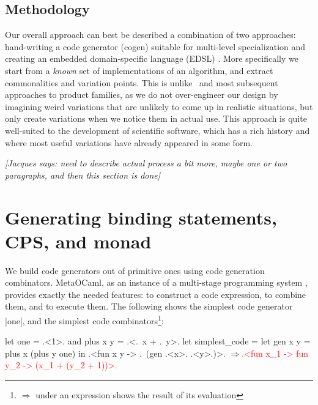 \documentclass[draft]{elsart}
\newcommand{\evalresult}[1]{\ensuremath{\Longrightarrow}\textcolor{red}{#1}}
\newcommand{\jacques}[1]{{\it [Jacques says: #1]}}
\begin{document}
\subsection{Methodology}

Our overall approach can best be described a combination 
of two approaches: hand-writing a code generator (cogen) suitable
for multi-level specialization \cite{Gluck95,GluckJ97} and creating
an embedded domain-specific language (EDSL) \cite{edsl,WhenHowDSL}.
More specifically we start from a \emph{known} set of implementations
of an algorithm, and extract commonalities and variation points.
This is unlike~\cite{journals/tse/Parnas76} and most subsequent
approaches to product families, as we do not over-engineer our design
by imagining weird variations that are unlikely to come up in realistic
situations, but only create variations when we notice them in actual use.
This approach is quite well-suited to the development of scientific
software, which has a rich history and where most useful variations have
already appeared in some form.

\jacques{need to describe actual process a bit more, maybe one or two
paragraphs, and then this section is done}

\section{Generating binding statements, CPS, and monad}\label{CPS}

We build code generators out of primitive ones using code generation 
combinators. MetaOCaml, as an instance of a multi-stage
programming system \cite{TahaThesis}, provides exactly the needed
features: to construct a code expression, to combine them, and to
execute them. The following shows the simplest code generator |one|,
and the simplest code combinators\footnote{%
$\Longrightarrow$ under an expression shows the result of its evaluation}:

\begin{code}
let one = .<1>. and plus x y = .<.~x + .~y>.
let simplest_code = let gen x y = plus x (plus y one) in
  .<fun x y -> .~(gen .<x>. .<y>.)>.
\evalresult{.<fun x_1 -> fun y_2 -> (x_1 + (y_2 + 1))>.}
\end{code}
\end{document}
